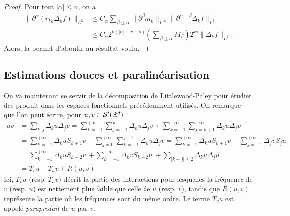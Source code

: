 \documentclass[11pt,a4paper]{article}
\begin{document}
\begin{proof}
Pour tout $|\alpha|\leq n$, on a 
\begin{align*}
\|\partial^\alpha (m_k\Delta_kf)\|_{L^2} &\leq C_\alpha \sum_{\beta \leq \alpha} \|\partial^\beta m_k\|_{L^\infty} \|\partial^{\alpha-\beta}\Delta_kf\|_{L^2} \\
&\leq C_\alpha 2^{k(|\alpha|-r-s)}\left(\sum_{\beta\leq \alpha} M_\beta \right)2^{ks}\|\Delta_kf\|_{L^2}.
\end{align*}
Alors, la  permet d'aboutir au résultat voulu.
\end{proof}
\subsection{Estimations douces et paralinéarisation}
On va maintenant se servir de la décomposition de Littlewood-Paley pour étudier des produit dans les espaces fonctionnels précédemment utilisés. On remarque que l'on peut écrire, pour $u,v \in \mathcal{S}'(\mathbb R^d)$ : 
\begin{align*}
uv &=\sum_{k,j}\Delta_ku\Delta_jv = \sum_{k=-1}^{+\infty}\sum_{j=-1}^{p}\Delta_ku\Delta_jv + \sum_{k=-1}^{+\infty}\sum_{j=k+1}^{+\infty}\Delta_ku\Delta_jv \\
&=\sum_{k=-1}^{+\infty}\Delta_kuS_{k+1}v +  \sum_{j=0}^{+\infty}\sum_{k=-1}^{j-1}\Delta_ku\Delta_jv = \sum_{k=-1}^{+\infty}\Delta_kuS_{k+1}v +  \sum_{j=-1}^{+\infty}\Delta_jvS_{j}u \\
&= \sum_{k=-1}^{+\infty}\Delta_kuS_{k-2}v  \ +  \sum_{k=-1}^{+\infty}\Delta_kvS_{k-2}u \ + \sum_{|k-j|\leq 2} \Delta_ku\Delta_ju \\
&= T_vu + T_uv + R(u,v)
\end{align*}
Ici, $T_vu$ (resp. $T_uv$) décrit la partie des interactions pour lesquelles la fréquence de $v$ (resp. $u$) est nettement plus faible que celle de $u$ (resp. $v$), tandis que $R(u,v)$ représente la partie où les fréquences sont du même ordre. Le terme $T_vu$ est appelé \textit{paraproduit} de $u$ par $v$.
\end{document}
